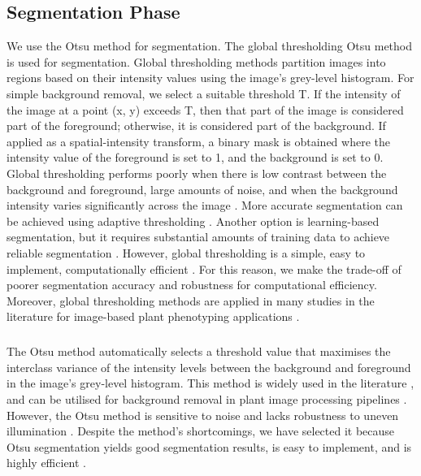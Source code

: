 \subsection{Segmentation Phase}
We use the Otsu method \cite{otsuThresholdSelectionMethod1979} for segmentation. The global thresholding Otsu method is used for segmentation. Global thresholding methods partition images into regions based on their intensity values using the image's grey-level histogram. For simple background removal, we select a suitable threshold T. If the intensity of the image at a point (x, y) exceeds T, then that part of the image is considered part of the foreground; otherwise, it is considered part of the background. If applied as a spatial-intensity transform, a binary mask is obtained where the intensity value of the foreground is set to 1, and the background is set to 0.  Global thresholding performs poorly when there is low contrast between the background and foreground, large amounts of noise, and when the background intensity varies significantly across the image \cite{rogowskaChapter5Overview2009}. More accurate segmentation can be achieved using adaptive thresholding \cite{jardimImageThresholdingApproaches2023}. Another option is learning-based segmentation, but it requires substantial amounts of training data to achieve reliable segmentation \cite{samalIntelligentImageAnalysis2021}. However, global thresholding is a simple, easy to implement, computationally efficient \cite{gonzalezDigitalImageProcessing2017, jardimImageThresholdingApproaches2023}. For this reason, we make the trade-off of poorer segmentation accuracy and robustness for computational efficiency. Moreover, global thresholding methods are applied in many studies in the literature for image-based plant phenotyping applications \cite{liReviewComputerVision2020}.

\subparagraph{}
The Otsu method automatically selects a threshold value that maximises the interclass variance of the intensity levels between the background and foreground in the image's grey-level histogram. This method is widely used in the literature \cite{liReviewComputerVision2020, najjarFlowerImageSegmentation2012}, and can be utilised for background removal in plant image processing pipelines \cite{perez-sanzPlantPhenomicsOverview2017}. However, the Otsu method is sensitive to noise and lacks robustness to uneven illumination \cite{liReviewComputerVision2020}. Despite the method's shortcomings, we have selected it because Otsu segmentation yields good segmentation results, is easy to implement, and is highly efficient \cite{najjarFlowerImageSegmentation2012, liReviewComputerVision2020}. 

